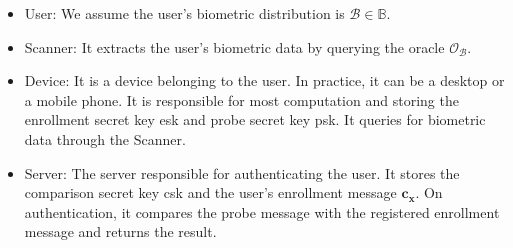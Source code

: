 \begin{itemize}

	\item {\sf User}: We assume the user's biometric distribution is $\mathcal{B} \in \mathbb{B}$. 
	\item {\sf Scanner}: It extracts the user's biometric data by querying the oracle $\mathcal{O}_{\mathcal{B}}$.
	\item {\sf Device}: It is a device belonging to the user. In practice, it can be a desktop or a mobile phone. It is responsible for most computation and storing the enrollment secret key {\sf esk} and probe secret key {\sf psk}. It queries for biometric data through the {\sf Scanner}.
	\item {\sf Server}: The server responsible for authenticating the user. It stores the comparison secret key {\sf csk} and the user's enrollment message $\mathbf{c_x}$. On authentication, it compares the probe message with the registered enrollment message and returns the result.  

\end{itemize}










			
